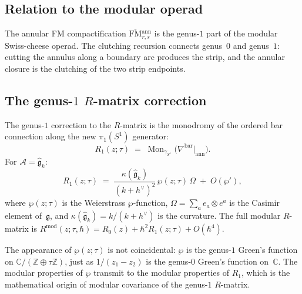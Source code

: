 \documentclass[11pt]{article}
\newcommand{\cA}{\mathcal{A}}
\newcommand{\fg}{\mathfrak{g}}
\newcommand{\C}{\mathbb{C}}
\newcommand{\Z}{\mathbb{Z}}
\newcommand{\FM}{\mathrm{FM}}
\begin{document}
\subsection{Relation to the modular operad}
\label{subsec:annular-modular-wn}

\begin{theorem}
\label{thm:annular-modular-wn}
The annular FM compactification
$\overline{\FM}{}^{\mathrm{ann}}_{r,s}$ is the genus-$1$ part
of the modular Swiss-cheese operad.  The clutching recursion
connects genus~$0$ and genus~$1$: cutting the annulus along a
boundary arc produces the strip, and the annular closure is the
clutching of the two strip endpoints.
\end{theorem}

\subsection{The genus-$1$ $R$-matrix correction}
\label{subsec:genus1-R-matrix-wn}

\begin{theorem}
\label{thm:genus1-R-matrix-wn}
The genus-$1$ correction to the $R$-matrix is the monodromy of
the ordered bar connection along the new $\pi_1(S^1)$ generator:
\[
R_1(z;\tau)
\;=\;
\operatorname{Mon}_{\gamma_{S^1}}
\bigl(\nabla^{\mathrm{bar}}\big|_{\mathrm{ann}}\bigr).
\]
For $\cA=\widehat{\fg}_k$:
\[
R_1(z;\tau)
\;=\;
\frac{\kappa(\widehat{\fg}_k)}{(k+h^\vee)^2}\,
\wp(z;\tau)\,\Omega
\;+\;
O(\wp'),
\]
where $\wp(z;\tau)$ is the Weierstrass $\wp$-function,
$\Omega=\sum_a e_a\otimes e^a$ is the Casimir element
of~$\fg$, and $\kappa(\widehat{\fg}_k)=k/(k+h^\vee)$ is the
curvature.  The full modular $R$-matrix is
$R^{\mathrm{mod}}(z;\tau,\hbar)=R_0(z)+\hbar^2 R_1(z;\tau)+O(\hbar^4)$.
\end{theorem}

\begin{remark}
The appearance of $\wp(z;\tau)$ is not coincidental: $\wp$ is the
genus-$1$ Green's function on $\C/(\Z\oplus\tau\Z)$, just as
$1/(z_1-z_2)$ is the genus-$0$ Green's function on~$\C$.  The
modular properties of $\wp$ transmit to the modular
properties of $R_1$, which is the mathematical origin of modular
covariance of the genus-$1$ $R$-matrix.
\end{remark}



\end{document}
